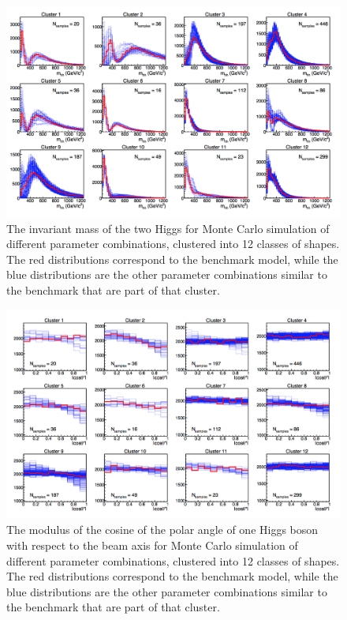 \begin{figure}[h]
\centering
\includegraphics[scale=0.5]{F2/MHHClusters.png}
\caption{The invariant mass of the two Higgs for Monte Carlo simulation of different parameter combinations, clustered into 12 classes of shapes. The red distributions correspond to the benchmark model, while the blue distributions are the other parameter combinations similar to the benchmark that are part of that cluster.}
\label{Fig:MHHClusters}
\end{figure}

\begin{figure}[h]
\centering
\includegraphics[scale=0.5]{F2/CosClusters.png}
\caption{The modulus of the cosine of the polar angle of one Higgs boson with respect to the beam axis for Monte Carlo simulation of different parameter combinations, clustered into 12 classes of shapes. The red distributions correspond to the benchmark model, while the blue distributions are the other parameter combinations similar to the benchmark that are part of that cluster.}
\label{Fig:CosClusters}
\end{figure}